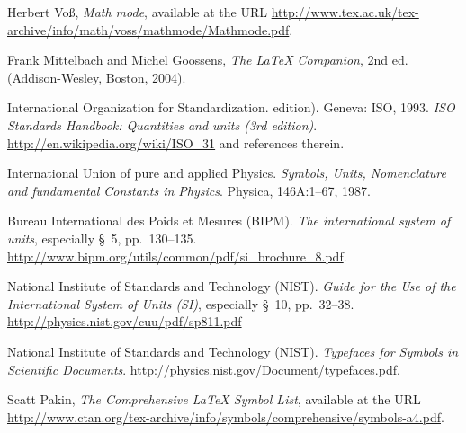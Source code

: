 \documentclass{cernphprep}
\begin{document}
\begin{thebibliography}{99}\raggedright
{} Herbert Vo{\ss},
  \emph{Math mode}, available at the URL\newline
\url{http://www.tex.ac.uk/tex-archive/info/math/voss/mathmode/Mathmode.pdf}.

 Frank Mittelbach and Michel Goossens,
  \emph{The \LaTeX{} Companion}, 2nd ed. (Addison-Wesley, Boston,
  2004).

 International Organization for Standardization.
edition). Geneva: ISO, 1993.
\newblock \emph{ ISO Standards Handbook: Quantities and units (3rd edition)}.  
\newblock \url{http://en.wikipedia.org/wiki/ISO_31} and references therein.

International Union of pure and applied Physics.
\newblock \emph{Symbols, Units, Nomenclature and fundamental Constants
in Physics}.
\newblock Physica, 146A:1--67, 1987.

Bureau International des Poids et Mesures (BIPM).
\newblock \emph{The international system of units}, especially \S~5, pp.~130--135.
\newblock \url{http://www.bipm.org/utils/common/pdf/si_brochure_8.pdf}.

 National Institute of Standards and Technology
(NIST).  \newblock \emph{Guide for the Use of the International System
of Units (SI)}, especially \S~10, pp.~32--38.\newline
\newblock \url{http://physics.nist.gov/cuu/pdf/sp811.pdf}

National Institute of Standards and Technology (NIST).
\newblock \emph{Typefaces for Symbols in Scientific Documents}.
\newblock \url{http://physics.nist.gov/Document/typefaces.pdf}.

 Scatt Pakin,
  \emph{The Comprehensive \LaTeX{} Symbol List}, available at the URL\newline
\url{http://www.ctan.org/tex-archive/info/symbols/comprehensive/symbols-a4.pdf}.
 
\end{thebibliography}
\end{document}
